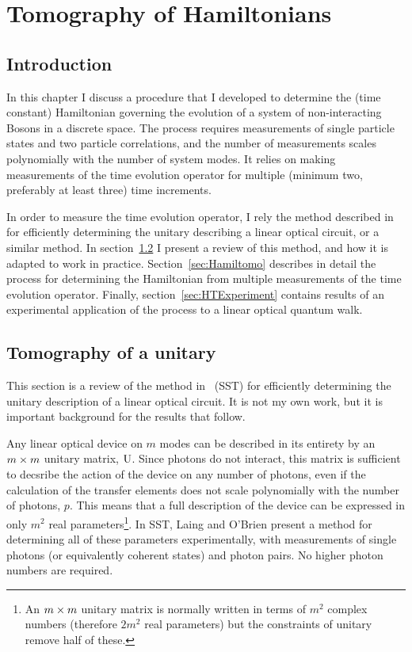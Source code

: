\chapter{Tomography of Hamiltonians}
\label{ch:Hamiltomo}

\section{Introduction}
\label{sec:HTIntro}
In this chapter I discuss a procedure that I developed to determine the
(time constant) Hamiltonian governing the evolution of a system of
non-interacting Bosons in a discrete space. The process requires measurements of
single particle states and two particle correlations, and the number of
measurements scales polynomially with the number of system modes. It relies on
making measurements of the time evolution operator for multiple (minimum two,
preferably at least three) time increments.

In order to measure the time
evolution operator, I rely the method described in~\cite{sst} for efficiently
determining the unitary describing a linear optical circuit, or a similar
method. In section~\ref{sec:SST} I present a review of this method, and how it
is adapted to work in practice. Section~\ref{sec:Hamiltomo} describes in detail
the process for determining the Hamiltonian from multiple measurements of the
time evolution operator. Finally, section~\ref{sec:HTExperiment} contains
results of an experimental application of the process to a linear optical
quantum walk.

\section{Tomography of a unitary}
\label{sec:SST}
This section is a review of the method in~\cite{sst} (SST) for efficiently
determining the unitary description of a linear optical circuit. It is not my
own work, but it is important background for the results that follow.

Any linear optical device on \(m\) modes can be described in its entirety by an
\(m \times m\) unitary matrix, \(\mathrm{U}\). Since photons do not interact, this
matrix is sufficient to decsribe the action of the device on any number of
photons, even if the calculation of the transfer elements does not scale
polynomially with the number of photons, \(p\). This means that a full
description of the device can be expressed in only \(m^{2}\) real
parameters\footnote{An \(m \times m\) unitary matrix is normally written in terms
of \(m^{2}\) complex numbers (therefore \(2m^{2}\) real parameters) but the
constraints of unitary remove half of these.}. In SST, Laing and O'Brien
present a method for determining all of these parameters experimentally, with
measurements of single photons (or equivalently coherent states) and photon
pairs. No higher photon numbers are required.

